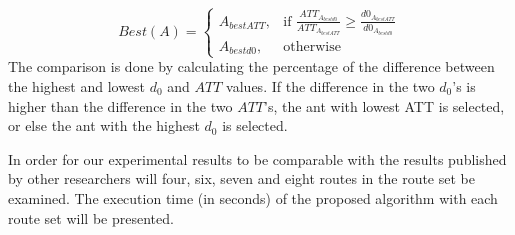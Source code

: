 \[
    Best(A)= 
\begin{cases}
    A_{bestATT},& \text{if } \frac{ATT_{A_{bestd0}}}{ATT_{A_{bestATT}}}\geq \frac{d0_{A_{bestATT}}}{d0_{A_{bestd0}}}\\
    A_{bestd0},& \text{otherwise}
\end{cases}
\]
The comparison is done by calculating the percentage of the difference between the highest and lowest $d_0$ and $ATT$ values. If the difference in the two $d_0$'s is higher than the difference in the two $ATT$'s, the ant with lowest ATT is selected, or else the ant with the highest $d_0$ is selected. %

In order for our experimental results to be comparable with the results published by other researchers will four, six, seven and eight routes in the route set be examined. The execution time (in seconds) of the proposed algorithm with each route set will be presented.








